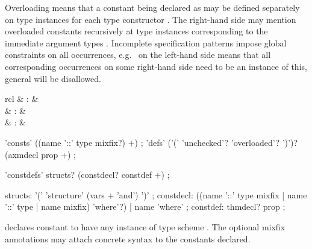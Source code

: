 \begin{isabellebody}
\begin{isamarkuptext}
  Overloading means that a constant being declared as  may be defined separately on type instances  for each type constructor .  The right-hand side may mention overloaded constants
  recursively at type instances corresponding to the immediate
  argument types .  Incomplete
  specification patterns impose global constraints on all occurrences,
  e.g.\  on the left-hand side means that all
  corresponding occurrences on some right-hand side need to be an
  instance of this, general  will be disallowed.

  \begin{matharray}{rcl}
    \mbox{} & : &  \\
    \mbox{} & : &  \\
    \mbox{} & : &  \\
  \end{matharray}

  \begin{rail}
    'consts' ((name '::' type mixfix?) +)
    ;
    'defs' ('(' 'unchecked'? 'overloaded'? ')')? \\ (axmdecl prop +)
    ;
  \end{rail}

  \begin{rail}
    'constdefs' structs? (constdecl? constdef +)
    ;

    structs: '(' 'structure' (vars + 'and') ')'
    ;
    constdecl:  ((name '::' type mixfix | name '::' type | name mixfix) 'where'?) | name 'where'
    ;
    constdef: thmdecl? prop
    ;
  \end{rail}

  \begin{descr}

  \item [\mbox{\isa{\isacommand{consts}}}~\isa{c\ {\isacharcolon}{\isacharcolon}\ {\isasymsigma}}] declares constant
   to have any instance of type scheme \isa{{\isasymsigma}}.  The
  optional mixfix annotations may attach concrete syntax to the
  constants declared.
  

\end{descr}
\end{isamarkuptext}
\end{isabellebody}
